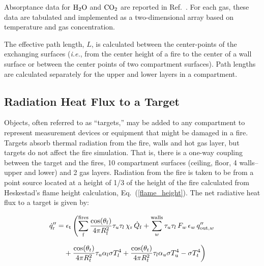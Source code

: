 \documentclass[12pt,twoside]{book}
\begin{document}
Absorptance data for $\textnormal{H}_2 \textnormal{O}$ and $\textnormal{CO}_2$ are reported in Ref.~\cite{Edwards:1985}. For each gas, these data are tabulated and implemented as a two-dimensional array based on temperature and gas concentration.

The effective path length, $L$, is calculated between the center-points of the exchanging surfaces (\emph{i.e.}, from the center height of a fire to the center of a wall surface or between the center points of two compartment surfaces). Path lengths are calculated separately for the upper and lower layers in a compartment.

\subsection{Radiation Heat Flux to a Target}
\label{section:target}

Objects, often referred to as ``targets,'' may be added to any compartment  to represent measurement devices or equipment that might be damaged in a fire. Targets absorb thermal radiation from the fire, walls and hot gas layer, but targets do not affect the fire simulation. That is, there is a one-way coupling between the target and the fires, 10 compartment surfaces (ceiling, floor, 4 walls--upper and lower) and 2 gas layers. Radiation from the fire is taken to be from a point source located at a height of 1/3 of the height of the fire calculated from Heskestad's flame height calculation, Eq.~(\ref{flame_height}).  The net radiative heat flux to a target is given by:

\begin{equation}
\begin{aligned}
\dq_{\mathrm{r}}'' &= \epsilon_{\mathrm{t}} \left(
  \sum_{\mathrm{f}}^{\mathrm{fires}}
  \frac{\cos(\theta_{\mathrm{f}})}{4 \pi R_{\mathrm{f}}^2} \tau_u \tau_l \, \chi_{\mathrm{r}} \, \dQ_{\mathrm{f}}
  + \sum_w^{\mathrm{walls}} \tau_u \tau_l \, F_w \, \epsilon_w \, \qout{w} \right. \\[.1in]
& \hphantom{\epsilon_{\mathrm{t}}} \left.
  {}+ \frac{\cos(\theta_t)}{4\pi R_t^2}\tau_u \alpha_l \sigma T_l^4
  + \frac{\cos(\theta_t)}{4\pi R_t^2}\tau_l \alpha_u\sigma \Tu^4 - \sigma T_t^4 \right)
\end{aligned}
\label{target_rad}
\end{equation}
\end{document}
